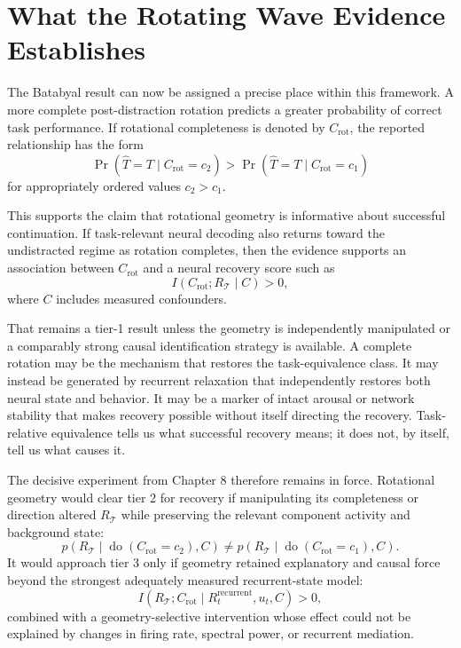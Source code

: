 \documentclass[11pt]{book}
\begin{document}
\section*{What the Rotating Wave Evidence Establishes}

The Batabyal result can now be assigned a precise place within this framework. A more complete post-distraction rotation predicts a greater probability of correct task performance. If rotational completeness is denoted by $C_{\mathrm{rot}}$, the reported relationship has the form
\[
\Pr\!\left(
\widehat T=T
\mid
C_{\mathrm{rot}}=c_2
\right)
>
\Pr\!\left(
\widehat T=T
\mid
C_{\mathrm{rot}}=c_1
\right)
\]
for appropriately ordered values $c_2>c_1$.

This supports the claim that rotational geometry is informative about successful continuation. If task-relevant neural decoding also returns toward the undistracted regime as rotation completes, then the evidence supports an association between $C_{\mathrm{rot}}$ and a neural recovery score such as
\[
I(C_{\mathrm{rot}};R_{\mathcal T}\mid C)>0,
\]
where $C$ includes measured confounders.

That remains a tier-1 result unless the geometry is independently manipulated or a comparably strong causal identification strategy is available. A complete rotation may be the mechanism that restores the task-equivalence class. It may instead be generated by recurrent relaxation that independently restores both neural state and behavior. It may be a marker of intact arousal or network stability that makes recovery possible without itself directing the recovery. Task-relative equivalence tells us what successful recovery means; it does not, by itself, tell us what causes it.

The decisive experiment from Chapter 8 therefore remains in force. Rotational geometry would clear tier 2 for recovery if manipulating its completeness or direction altered $R_{\mathcal T}$ while preserving the relevant component activity and background state:
\[
p\!\left(
R_{\mathcal T}
\mid
\operatorname{do}(C_{\mathrm{rot}}=c_2),C
\right)
\neq
p\!\left(
R_{\mathcal T}
\mid
\operatorname{do}(C_{\mathrm{rot}}=c_1),C
\right).
\]
It would approach tier 3 only if geometry retained explanatory and causal force beyond the strongest adequately measured recurrent-state model:
\[
I\!\left(
R_{\mathcal T};
C_{\mathrm{rot}}
\mid
R_t^{\mathrm{recurrent}},u_t,C
\right)>0,
\]
combined with a geometry-selective intervention whose effect could not be explained by changes in firing rate, spectral power, or recurrent mediation.
\end{document}
